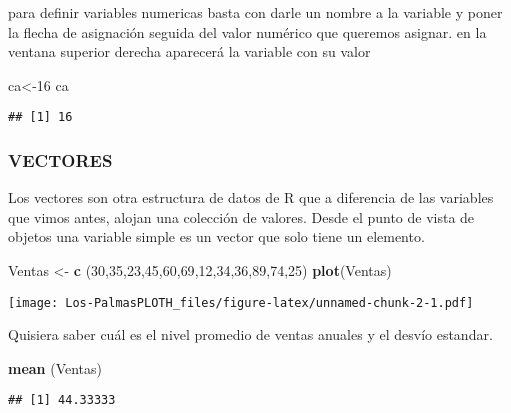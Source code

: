 \documentclass[
]{article}
\newenvironment{Shaded}{\begin{snugshade}}{\end{snugshade}}
\newcommand{\DecValTok}[1]{\textcolor[rgb]{0.00,0.00,0.81}{#1}}
\newcommand{\FunctionTok}[1]{\textcolor[rgb]{0.13,0.29,0.53}{\textbf{#1}}}
\newcommand{\NormalTok}[1]{#1}
\newcommand{\OtherTok}[1]{\textcolor[rgb]{0.56,0.35,0.01}{#1}}
\begin{document}
para definir variables numericas basta con darle un nombre a la variable
y poner la flecha de asignación seguida del valor numérico que queremos
asignar. en la ventana superior derecha aparecerá la variable con su
valor

\begin{Shaded}
\begin{Highlighting}[]
\NormalTok{ca}\OtherTok{\textless{}{-}}\DecValTok{16}
\NormalTok{ca}
\end{Highlighting}
\end{Shaded}

\begin{verbatim}
## [1] 16
\end{verbatim}

\hypertarget{vectores}{%
\subsubsection{VECTORES}\label{vectores}}

Los vectores son otra estructura de datos de R que a diferencia de las
variables que vimos antes, alojan una colección de valores. Desde el
punto de vista de objetos una variable simple es un vector que solo
tiene un elemento.

\begin{Shaded}
\begin{Highlighting}[]
\NormalTok{Ventas }\OtherTok{\textless{}{-}} \FunctionTok{c}\NormalTok{ (}\DecValTok{30}\NormalTok{,}\DecValTok{35}\NormalTok{,}\DecValTok{23}\NormalTok{,}\DecValTok{45}\NormalTok{,}\DecValTok{60}\NormalTok{,}\DecValTok{69}\NormalTok{,}\DecValTok{12}\NormalTok{,}\DecValTok{34}\NormalTok{,}\DecValTok{36}\NormalTok{,}\DecValTok{89}\NormalTok{,}\DecValTok{74}\NormalTok{,}\DecValTok{25}\NormalTok{)}
\FunctionTok{plot}\NormalTok{(Ventas)}
\end{Highlighting}
\end{Shaded}

\texttt{[image: Los-PalmasPLOTH\_files/figure-latex/unnamed-chunk-2-1.pdf]}

Quisiera saber cuál es el nivel promedio de ventas anuales y el desvío
estandar.

\begin{Shaded}
\begin{Highlighting}[]
\FunctionTok{mean}\NormalTok{ (Ventas)}
\end{Highlighting}
\end{Shaded}

\begin{verbatim}
## [1] 44.33333
\end{verbatim}
\end{document}
